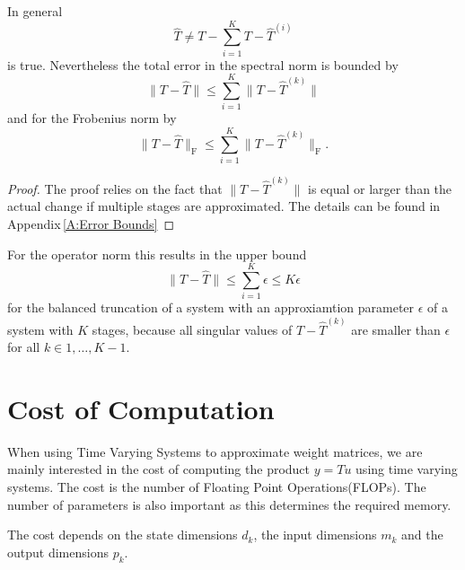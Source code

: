 \documentclass[doctype=mastersthesis,BCOR=15mm,biblatex]{ldvbook}%
\begin{document}
In general 
\begin{equation}
	\hat{T} \neq T - \sum_{i=1}^K T-\hat{T}^{(i)}
\end{equation}
is true.
Nevertheless the total error in the spectral norm is bounded by 
\begin{equation}
	\|T-\hat{T}\| \leq \sum_{i=1}^K \|T-\hat{T}^{(k)}\|
\end{equation}
and for the Frobenius norm by
\begin{equation}
\|T-\hat{T}\|_\text{F} \leq \sum_{i=1}^K \|T-\hat{T}^{(k)}\|_\text{F}
.
\end{equation}
\begin{proof}
	The proof relies on the fact that $\|T-\hat{T}^{(k)}\|$ is equal or larger than the actual change if multiple stages are approximated.
	The details can be found in Appendix\,\ref{A:Error Bounds}
\end{proof}


For the operator norm this results in the upper bound 
\begin{equation}\label{eq:bound_spectral_K}
	\|T-\hat{T}\| \leq \sum_{i=1}^K \epsilon \leq K\epsilon
\end{equation}
for the balanced truncation of a system with an approxiamtion parameter $\epsilon$ of a system with $K$ stages,
because all singular values of $T-\hat{T}^{(k)}$ are smaller than $\epsilon$ for all $k \in {1,\dots,K-1}$.



\section{Cost of Computation} \label{sec:cost}
When using Time Varying Systems to approximate weight matrices, we are mainly interested in the cost of computing the product $y = Tu$ using time varying systems.
The cost is the number of Floating Point Operations(FLOPs).
The number of parameters is also important as this determines the required memory.

The cost depends on the state dimensions $d_k$, the input dimensions $m_k$ and the output dimensions $p_k$.
\end{document}
